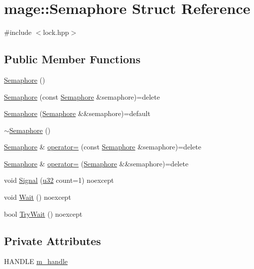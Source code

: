 \hypertarget{structmage_1_1_semaphore}{}\section{mage\+:\+:Semaphore Struct Reference}
\label{structmage_1_1_semaphore}


{\ttfamily \#include $<$lock.\+hpp$>$}

\subsection*{Public Member Functions}
\begin{DoxyCompactItemize}
\item 
\hyperlink{structmage_1_1_semaphore_a7b4f53c18b9a244ed98ef58fa5cfa2bb}{Semaphore} ()
\item 
\hyperlink{structmage_1_1_semaphore_a8873b2ed82ff66d323a8c3cebf0fb5c0}{Semaphore} (const \hyperlink{structmage_1_1_semaphore}{Semaphore} \&semaphore)=delete
\item 
\hyperlink{structmage_1_1_semaphore_a78484faaaff49a28c1f9ec7ad61f526f}{Semaphore} (\hyperlink{structmage_1_1_semaphore}{Semaphore} \&\&semaphore)=default
\item 
\hyperlink{structmage_1_1_semaphore_a991ed365c28e4a9c63ff34a5efeb012d}{$\sim$\+Semaphore} ()
\item 
\hyperlink{structmage_1_1_semaphore}{Semaphore} \& \hyperlink{structmage_1_1_semaphore_af3308cf7fa1ed33cda0ee53b9565f658}{operator=} (const \hyperlink{structmage_1_1_semaphore}{Semaphore} \&semaphore)=delete
\item 
\hyperlink{structmage_1_1_semaphore}{Semaphore} \& \hyperlink{structmage_1_1_semaphore_a7ce33136147e745f75d51abc77cd845c}{operator=} (\hyperlink{structmage_1_1_semaphore}{Semaphore} \&\&semaphore)=delete
\item 
void \hyperlink{structmage_1_1_semaphore_abe75693eee933bd48d06c5956d11c91e}{Signal} (\hyperlink{namespacemage_af2b398bf98eb10351f49cad73fe2cc73}{u32} count=1) noexcept
\item 
void \hyperlink{structmage_1_1_semaphore_ab0be313e63792315ee9b227dea1184be}{Wait} () noexcept
\item 
bool \hyperlink{structmage_1_1_semaphore_a46d08edac69437678d05f354f10619de}{Try\+Wait} () noexcept
\end{DoxyCompactItemize}
\subsection*{Private Attributes}
\begin{DoxyCompactItemize}
\item 
H\+A\+N\+D\+LE \hyperlink{structmage_1_1_semaphore_ac1ded856984b4ac3739d9ff627838fda}{m\+\_\+handle}
\end{DoxyCompactItemize}


